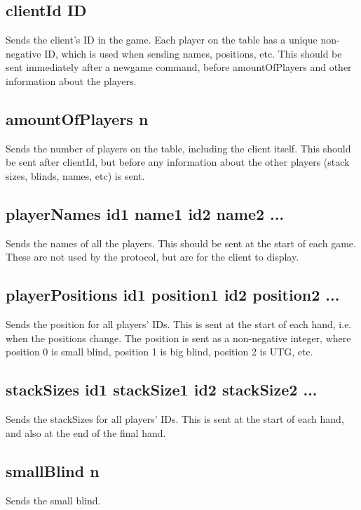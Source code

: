 \documentclass{article}
\begin{document}
\subsection*{clientId \textlangle{}ID\textrangle{}}
Sends the client's ID in the game. Each player on the table has a unique non-negative ID, which is used when sending names, positions, etc. This should be sent immediately after a newgame command, before amountOfPlayers and other information about the players.

\subsection*{amountOfPlayers \textlangle{}n\textrangle{}}
Sends the number of players on the table, including the client itself. This should be sent after clientId, but before any information about the other players (stack sizes, blinds, names, etc) is sent.

\subsection*{playerNames \textlangle{}id1 name1\textrangle{} \textlangle{}id2 name2\textrangle{} ... }
Sends the names of all the players. This should be sent at the start of each game. These are not used by the protocol, but are for the client to display.

\subsection*{playerPositions \textlangle{}id1 position1\textrangle{} \textlangle{}id2 position2\textrangle{} ... }
Sends the position for all players' IDs. This is sent at the start of each hand, i.e. when the positions change. The position is sent as a non-negative integer, where position 0 is small blind, position 1 is big blind, position 2 is UTG, etc.

\subsection*{stackSizes \textlangle{}id1 stackSize1\textrangle{} \textlangle{}id2 stackSize2\textrangle{} ... }
Sends the stackSizes for all players' IDs. This is sent at the start of each hand, and also at the end of the final hand.

\subsection*{smallBlind \textlangle{}n\textrangle{}}
Sends the small blind.
\end{document}
